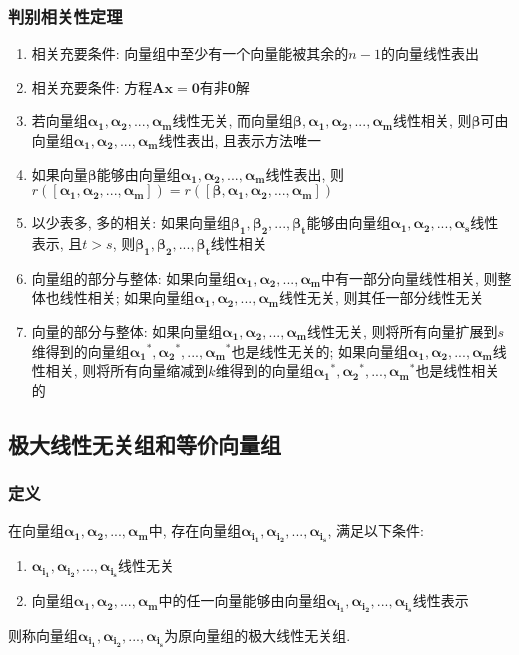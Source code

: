 \subsubsection{判别相关性定理}
\begin{enumerate}
\item 相关充要条件: 向量组中至少有一个向量能被其余的$ n-1 $的向量线性表出
\item 相关充要条件: 方程$ \bm{A}\bm{x}=\bm{0} $有非$ \bm{0} $解
\item 若向量组$ \bm{\alpha_{1}},\bm{\alpha_{2}},...,\bm{\alpha_{m}} $线性无关, 而向量组$ \bm{\beta}, \bm{\alpha_{1}},\bm{\alpha_{2}},...,\bm{\alpha_{m}} $线性相关, 则$ \bm{\beta} $可由向量组$ \bm{\alpha_{1}},\bm{\alpha_{2}},...,\bm{\alpha_{m}} $线性表出, 且表示方法唯一\label{ref:判别相关性}
\item 如果向量$ \bm{\beta} $能够由向量组$ \bm{\alpha_{1}},\bm{\alpha_{2}},...,\bm{\alpha_{m}} $线性表出, 则$ r([\bm{\alpha_{1}},\bm{\alpha_{2}},...,\bm{\alpha_{m}}])=r([\bm{\beta},\bm{\alpha_{1}},\bm{\alpha_{2}},...,\bm{\alpha_{m}}]) $
\item 以少表多, 多的相关: 如果向量组$ \bm{\beta_{1}},\bm{\beta_{2}},...,\bm{\beta_{t}} $能够由向量组$ \bm{\alpha_{1}},\bm{\alpha_{2}},...,\bm{\alpha_{s}} $线性表示, 且$ t>s $, 则$ \bm{\beta_{1}},\bm{\beta_{2}},...,\bm{\beta_{t}} $线性相关
\item 向量组的部分与整体:
\subitem 如果向量组$ \bm{\alpha_{1}},\bm{\alpha_{2}},...,\bm{\alpha_{m}} $中有一部分向量线性相关, 则整体也线性相关;
\subitem 如果向量组$ \bm{\alpha_{1}},\bm{\alpha_{2}},...,\bm{\alpha_{m}} $线性无关, 则其任一部分线性无关
\item 向量的部分与整体:
\subitem 如果向量组$ \bm{\alpha_{1}},\bm{\alpha_{2}},...,\bm{\alpha_{m}} $线性无关, 则将所有向量扩展到$ s $维得到的向量组$ \bm{\alpha_{1}}^{*},\bm{\alpha_{2}}^{*},...,\bm{\alpha_{m}}^{*} $也是线性无关的;
\subitem 如果向量组$ \bm{\alpha_{1}},\bm{\alpha_{2}},...,\bm{\alpha_{m}} $线性相关, 则将所有向量缩减到$ k $维得到的向量组$ \bm{\alpha_{1}}^{*},\bm{\alpha_{2}}^{*},...,\bm{\alpha_{m}}^{*} $也是线性相关的
\end{enumerate}
\subsection{极大线性无关组和等价向量组}
\subsubsection{定义}
在向量组$ \bm{\alpha_{1}},\bm{\alpha_{2}},...,\bm{\alpha_{m}} $中, 存在向量组$ \bm{\alpha_{i_{1}}},\bm{\alpha_{i_{2}}},...,\bm{\alpha_{i_{s}}} $, 满足以下条件:
\begin{enumerate}
\item $ \bm{\alpha_{i_{1}}},\bm{\alpha_{i_{2}}},...,\bm{\alpha_{i_{s}}} $线性无关
\item 向量组$ \bm{\alpha_{1}},\bm{\alpha_{2}},...,\bm{\alpha_{m}} $中的任一向量能够由向量组$ \bm{\alpha_{i_{1}}},\bm{\alpha_{i_{2}}},...,\bm{\alpha_{i_{s}}} $线性表示
\end{enumerate}\par
则称向量组$ \bm{\alpha_{i_{1}}},\bm{\alpha_{i_{2}}},...,\bm{\alpha_{i_{s}}} $为原向量组的极大线性无关组.
